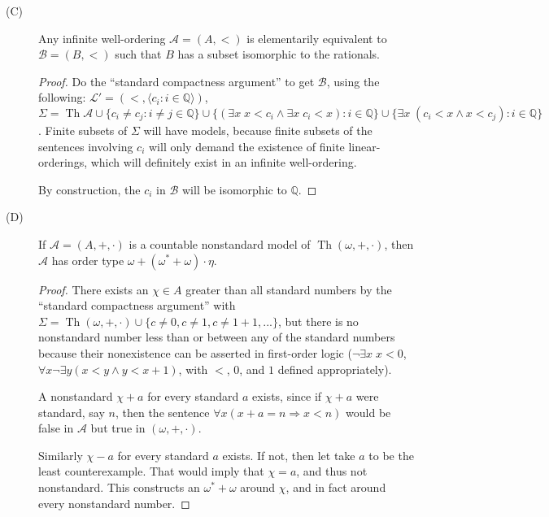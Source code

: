 \documentclass[12pt]{article}
\DeclareMathOperator{\theory}{Th}
\begin{document}
\begin{description}
\item[(C)] Any infinite well-ordering $\mathcal{A} = (A,<)$ is
elementarily equivalent to $\mathcal{B} = (B,<)$ such that $B$ has a
subset isomorphic to the rationals.
  \begin{proof}
	Do the ``standard compactness argument'' to get $\mathcal{B}$, using
	the following: $\mathcal{L'} = (<, \langle c_i : i \in \mathbb{Q}
	\rangle)$, $\Sigma = \theory{\mathcal{A}} \cup \{ c_i \ne c_j : i
	\ne j \in \mathbb{Q} \} \cup \{ (\exists x\; x < c_i \wedge \exists
	x\; c_i < x) : i \in \mathbb{Q} \} \cup \{ \exists x\; (c_i < x
	\wedge x < c_j) : i \in \mathbb{Q} \}$.  Finite subsets of $\Sigma$
	will have models, because finite subsets of the sentences involving
	$c_i$ will only demand the existence of finite linear-orderings,
	which will definitely exist in an infinite well-ordering. 
	
	By construction, the $c_i$ in $\mathcal{B}$ will be isomorphic to
	$\mathbb{Q}$.
  \end{proof}

\item[(D)] If $\mathcal{A} = (A, +, \cdot)$ is a countable nonstandard
model of $\theory{(\omega, +, \cdot)}$, then $\mathcal{A}$ has order
type $\omega + (\omega^* + \omega) \cdot \eta$.
  \begin{proof}
	There exists an $\chi \in A$ greater than all standard numbers by the
	``standard compactness argument'' with $\Sigma =
	\theory{(\omega,+,\cdot)} \cup \{ c \ne 0, c \ne 1, c \ne 1+1, ...
	\}$, but there is no nonstandard number less than or between any of
	the standard numbers because their nonexistence can be asserted in
	first-order logic ($\neg \exists x\; x < 0$, $\forall x 
	\neg \exists y (x < y \wedge y < x+1)$, with $<$, $0$, and $1$
	defined appropriately).

	A nonstandard $\chi+a$ for every standard $a$ exists, since if
	$\chi+a$ were standard, say $n$, then the sentence $\forall x (x + a
	= n \Rightarrow x < n)$ would be false in $\mathcal{A}$ but true in
	$(\omega,+,\cdot)$.

	Similarly $\chi-a$ for every standard $a$ exists.  If not, then let
	take $a$ to be the least counterexample.  That would imply that
	$\chi = a$, and thus not nonstandard.  This constructs an $\omega^*
	+ \omega$ around $\chi$, and in fact around every nonstandard
	number.


\end{proof}
\end{description}
\end{document}
